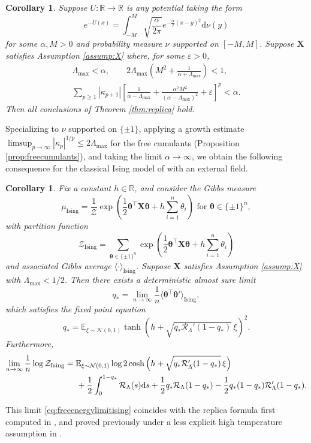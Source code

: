 \documentclass[11pt,letterpaper,reqno]{amsart}
\def\eps{\varepsilon}
\def\E{\mathbb{E}}
\def\R{\mathbb{R}}
\def\d{\mathrm{d}}
\def\btheta{\boldsymbol{\theta}}
\def\X{\mathbf{X}}
\def\cR{\mathcal{R}}
\def\cN{\mathcal{N}}
\def\cZ{\mathcal{Z}}
\def\Ising{\mathrm{Ising}}
\newtheorem{corollary}[theorem]{Corollary}
\theoremstyle{definition}
\numberwithin{equation}{section}
\begin{document}
\begin{corollary}\label{cor:hightemp}
Suppose $U:\R \to \R$ is any potential taking the form
\[e^{-U(x)}=\int_{-M}^M \sqrt{\frac{\alpha}{2\pi}}
e^{-\frac{\alpha}{2}(x-y)^2} \d\nu(y)\]
for some $\alpha,M>0$ and probability measure $\nu$ supported
on $[-M,M]$. Suppose $\X$ satisfies Assumption \ref{assump:X} where,
for some $\eps>0$,
\begin{equation}\label{eq:sufficientalphacondition}
\begin{gathered}
\Lambda_{\max}<\alpha, \qquad
2\Lambda_{\max}\left(M^2+\frac{1}{\alpha+\Lambda_{\max}}\right)<1,\\
\sum_{p \geq 1} |\kappa_{p+1}|
\left[\frac{1}{\alpha-\Lambda_{\max}}
+\frac{\alpha^2M^2}{(\alpha-\Lambda_{\max})^2}+\eps\right]^p<\alpha.
\end{gathered}
\end{equation}
Then all conclusions of Theorem \ref{thm:replica} hold.
\end{corollary}

Specializing to $\nu$ supported on $\{\pm 1\}$, applying a growth estimate
$\limsup_{p \to \infty} |\kappa_p|^{1/p} \leq 2\Lambda_{\max}$ for the free
cumulants (Proposition \ref{prop:freecumulants}),
and taking the limit $\alpha \to \infty$,
we obtain the following consequence for the classical Ising model
of \cite{marinari1994replica} with an external field.

\begin{corollary}\label{cor:ising}
Fix a constant $h \in \R$, and consider the Gibbs measure
\begin{equation}\label{eq:ising}
\mu_\Ising=\frac{1}{\cZ}\exp\left(\frac{1}{2}\btheta^\top\X\btheta
+h\sum_{i=1}^n \theta_i\right) \text{ for } \btheta \in \{\pm 1\}^n,
\end{equation}
with partition function
\[\cZ_\Ising=\sum_{\btheta \in \{\pm 1\}^n}
\exp\left(\frac{1}{2}\btheta^\top\X\btheta
+h\sum_{i=1}^n \theta_i\right)\]
and associated Gibbs average $\langle \cdot \rangle_{\Ising}$.
Suppose $\X$ satisfies Assumption \ref{assump:X} with 
$\Lambda_{\max}<1/2$. Then there exists a deterministic almost sure limit
\[q_*=\lim_{n \to \infty} \frac{1}{n}\langle \btheta^\top \btheta'
\rangle_\Ising,\]
which satisfies the fixed point equation
\[q_*=\E_{\xi \sim \cN(0,1)}
\tanh\left(h+\sqrt{q_*\cR_\Lambda'(1-q_*)}\,\xi\right)^2.\]
Furthermore,
\begin{align}
\lim_{n \to \infty} \frac{1}{n}\log \cZ_\Ising
&=\E_{\xi \sim \cN(0,1)} \log 2\cosh\Big(
h+\sqrt{q_*\cR_\Lambda'(1-q_*)}\,\xi\Big)\notag\\
&\hspace{0.2in}+\frac{1}{2}\int_0^{1-q_*} \cR_\Lambda(s)\d s
+\frac{1}{2}q_*\cR_\Lambda(1-q_*)-\frac{1}{2}q_*(1-q_*)\cR_\Lambda'(1-q_*).\label{eq:freeenergylimitising}
\end{align}
\end{corollary}
This limit \eqref{eq:freeenergylimitising} coincides with the replica formula first computed in \cite{marinari1994replica}, and proved previously under a less explicit high temperature assumption in \cite{fan2024replica}.
\end{document}
